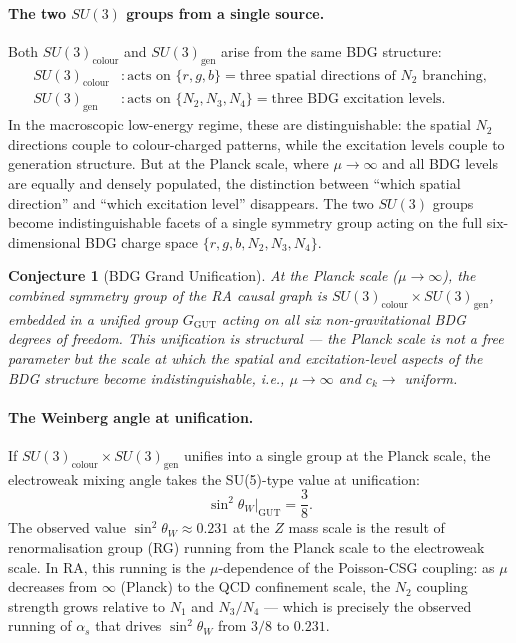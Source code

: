 \documentclass[11pt,a4paper]{article}
\newtheorem{conjecture}[theorem]{Conjecture}
\begin{document}
\paragraph{The two $SU(3)$ groups from a single source.}
Both $SU(3)_{\mathrm{colour}}$ and $SU(3)_{\mathrm{gen}}$ arise from the
same BDG structure:
\begin{align}
  SU(3)_{\mathrm{colour}} &: \text{acts on } \{r, g, b\}
  = \text{three spatial directions of } N_2 \text{ branching,} \\
  SU(3)_{\mathrm{gen}} &: \text{acts on } \{N_2, N_3, N_4\}
  = \text{three BDG excitation levels.}
\end{align}
In the macroscopic low-energy regime, these are distinguishable: the spatial
$N_2$ directions couple to colour-charged patterns, while the excitation
levels couple to generation structure. But at the Planck scale, where
$\mu \to \infty$ and all BDG levels are equally and densely populated, the
distinction between ``which spatial direction'' and ``which excitation level''
disappears. The two $SU(3)$ groups become indistinguishable facets of a
single symmetry group acting on the full six-dimensional BDG charge space
$\{r, g, b, N_2, N_3, N_4\}$.

\begin{conjecture}[BDG Grand Unification]
\label{conj:gut}
At the Planck scale ($\mu \to \infty$), the combined symmetry group of the
RA causal graph is $SU(3)_{\mathrm{colour}} \times SU(3)_{\mathrm{gen}}$,
embedded in a unified group $G_{\mathrm{GUT}}$ acting on all six non-gravitational
BDG degrees of freedom. This unification is structural --- the Planck scale
is not a free parameter but the scale at which the spatial and excitation-level
aspects of the BDG structure become indistinguishable, i.e., $\mu \to \infty$
and $c_k \to$ uniform.
\end{conjecture}

\paragraph{The Weinberg angle at unification.}
If $SU(3)_{\mathrm{colour}} \times SU(3)_{\mathrm{gen}}$ unifies into a
single group at the Planck scale, the electroweak mixing angle takes the
SU(5)-type value at unification:
\begin{equation}
  \sin^2\theta_W\big|_{\mathrm{GUT}} = \frac{3}{8}.
  \label{eq:weinberg_gut}
\end{equation}
The observed value $\sin^2\theta_W \approx 0.231$ at the $Z$ mass scale
is the result of renormalisation group (RG) running from the Planck scale
to the electroweak scale. In RA, this running is the $\mu$-dependence of
the Poisson-CSG coupling: as $\mu$ decreases from $\infty$ (Planck) to
the QCD confinement scale, the $N_2$ coupling strength grows relative to
$N_1$ and $N_3/N_4$ --- which is precisely the observed running of
$\alpha_s$ that drives $\sin^2\theta_W$ from $3/8$ to $0.231$.
\end{document}
